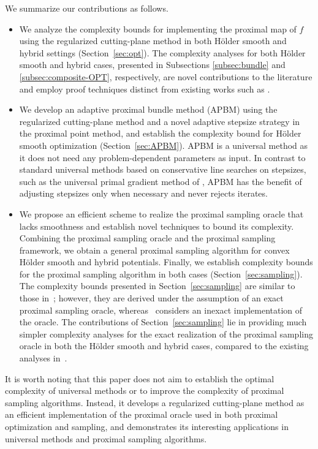\documentclass[11pt,letterpaper]{article}
\begin{document}
We summarize our contributions as follows.
\begin{itemize}
    \item[i)] We analyze the complexity bounds for implementing the proximal map of $f$ using the regularized cutting-plane method in both Hölder smooth and hybrid settings (Section~\ref{sec:opt}).
    The complexity analyses for both Hölder smooth and hybrid cases, presented in Subsections \ref{subsec:bundle} and \ref{subsec:composite-OPT}, respectively, are novel contributions to the literature and employ proof techniques distinct from existing works such as \cite{diaz2023optimal,du2017rate,kiwiel2000efficiency,liang2024unified,liang2020proximal}.
    \item[ii)] We develop an adaptive proximal bundle method (APBM) using the regularized cutting-plane method and a novel adaptive stepsize strategy in the proximal point method, and establish the complexity bound for Hölder smooth optimization (Section~\ref{sec:APBM}). APBM is a universal method as it does not need any problem-dependent parameters as input.
    In contrast to standard universal methods based on conservative line searches on stepsizes, such as the universal primal gradient method of \cite{nesterov2015universal}, APBM has the benefit of adjusting stepsizes only when necessary and never rejects iterates.
    \item[iii)] We propose an efficient scheme to realize the proximal sampling oracle that lacks smoothness and establish novel techniques to bound its complexity.
    Combining the proximal sampling oracle and the proximal sampling framework, we obtain a general proximal sampling algorithm for convex Hölder smooth and hybrid potentials. Finally, we establish complexity bounds for the proximal sampling algorithm in both cases (Section~\ref{sec:sampling}).
    The complexity bounds presented in Section~\ref{sec:sampling} are similar to those in~\cite{fan2023improved}; however, they are derived under the assumption of an exact proximal sampling oracle, whereas~\cite{fan2023improved} considers an inexact implementation of the oracle. The contributions of Section~\ref{sec:sampling} lie in providing much simpler complexity analyses for the exact realization of the proximal sampling oracle in both the Hölder smooth and hybrid cases, compared to the existing analyses in~\cite{liang2022proximal,liang2023a}.
\end{itemize}

It is worth noting that this paper does not aim to establish the optimal complexity of universal methods or to improve the complexity of proximal sampling algorithms. Instead, it develops a regularized cutting-plane method as an efficient implementation of the proximal oracle used in both proximal optimization and sampling, and demonstrates its interesting applications in universal methods and proximal sampling algorithms.
\end{document}

